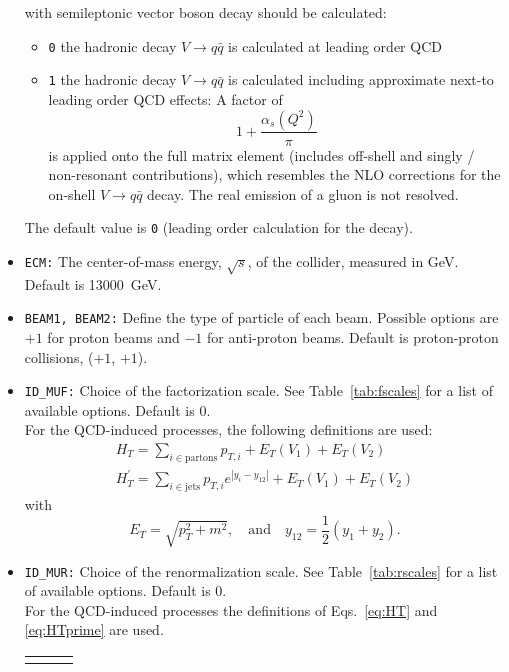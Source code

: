 \documentclass[english,12pt]{article}
\begin{document}
\begin{itemize}
  with semileptonic vector boson decay should be calculated: 
  \begin{itemize}
  \item {\tt 0} the hadronic decay $V\to q\bar{q}$ is calculated at leading order QCD
  \item {\tt 1} the hadronic decay $V\to q\bar{q}$ is calculated including approximate next-to
                leading order QCD effects:
                A factor of~\cite{Albert:1979ix} $$1+\frac{\alpha_s(Q^2)}{\pi}$$ is applied onto the full matrix element
                (includes off-shell and singly / non-resonant contributions),
                which resembles the NLO corrections for the on-shell $V\to q\bar{q}$ decay.
                The real emission of a gluon is not resolved.
  \end{itemize}
The default value is {\tt 0} (leading order calculation for the decay).
\item {\tt ECM:} The center-of-mass energy, $\sqrt{s}$, of the collider,
measured in GeV. Default is 13000~GeV.
\item {\tt BEAM1, BEAM2:} Define the type of particle of each beam. Possible
options are $+1$ for proton beams and $-1$ for anti-proton beams. Default
is proton-proton collisions, ($+1$, $+1$).
\item {\tt ID\_MUF:} Choice of the factorization scale. 
See Table~\ref{tab:fscales} for a list of available options. Default is 0.\\
For the QCD-induced processes, the following definitions are used:
\begin{eqnarray}
\label{eq:HT}
H_T = \sum_{i \in \text{partons}} p_{T,i} + E_T(V_1) + E_T(V_2) \\
\label{eq:HTprime}
H_T^{\prime} = \sum_{i \in \text{jets}}  p_{T,i} e^{| y_i - y_{12} |} + E_T(V_1) + E_T(V_2) 
\end{eqnarray}
with
$$ E_T = \sqrt{p_T^2+m^2}, \quad \text{and} \quad y_{12} = \frac{1}{2}(y_1 + y_2).$$
\item {\tt ID\_MUR:} Choice of the renormalization scale. 
See Table~\ref{tab:rscales} for a list of available options. Default is 0.\\
For the QCD-induced processes the definitions of Eqs.~\eqref{eq:HT} and \eqref{eq:HTprime} are used.
%
\begin{table}[t!]
\newcommand{\lstrut}{{$\strut\atop\strut$}}
\begin{center}
\begin{tabular}{c|p{7.5cm}|c}
\hline
&&\\

\end{tabular}
\end{center}
\end{table}
\end{itemize}
\end{document}
